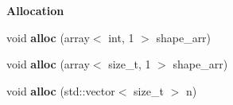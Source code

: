 \begin{Indent}{\bf Allocation}\par
{\em \label{_amgrp27c0ad7a8ff8f9df8e13bb2d974c95d0}
 }\begin{DoxyCompactItemize}
\item 
\hypertarget{class____array_a8a0f0e9f3af8384c29ddd21d3451b65e}{
void {\bfseries alloc} (array$<$ int, 1 $>$ shape\_\-arr)}
\label{class____array_a8a0f0e9f3af8384c29ddd21d3451b65e}

\item 
\hypertarget{class____array_a5e6bcbf0f6da1f52d3bb40e5671ae249}{
void {\bfseries alloc} (array$<$ size\_\-t, 1 $>$ shape\_\-arr)}
\label{class____array_a5e6bcbf0f6da1f52d3bb40e5671ae249}

\item 
\hypertarget{class____array_a96e39e536340b61efb3c148347ebd4ee}{
void {\bfseries alloc} (std::vector$<$ size\_\-t $>$ n)}
\label{class____array_a96e39e536340b61efb3c148347ebd4ee}

\end{DoxyCompactItemize}
\end{Indent}
